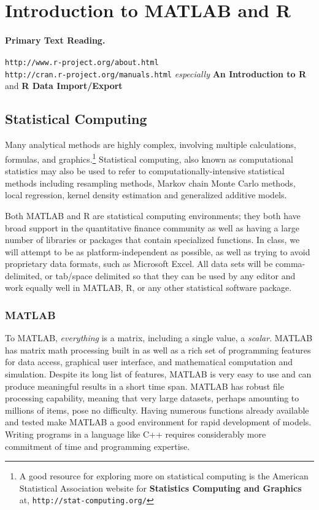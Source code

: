 \section{Introduction to MATLAB and R}
\paragraph{Primary Text Reading.}
\texttt{http://www.r-project.org/about.html} \\
\texttt{http://cran.r-project.org/manuals.html} \linebreak
\textit{especially} \textbf{An Introduction to R} and \textbf{R Data Import/Export}

\subsection{Statistical Computing}
Many analytical methods are highly complex, involving multiple calculations, formulas, and graphics.\footnote{A good resource for exploring more on statistical computing is the American Statistical Association website for \textbf{Statistics Computing and Graphics} at, \texttt{http://stat-computing.org/}}
Statistical computing, also known as computational statistics may also be used to refer to computationally-intensive statistical methods including resampling methods, Markov chain Monte Carlo methods, local regression, kernel density estimation and generalized additive models.

Both MATLAB and R are statistical computing environments; they both have broad support in the quantitative finance community as well as having a large number of libraries or packages that contain specialized functions. In class, we will attempt to be as platform-independent as possible, as well as trying to avoid proprietary data formats, such as Microsoft Excel. All data sets will be comma-delimited, or tab/space delimited so that they can be used by any editor and work equally well in MATLAB, R, or any other statistical software package.

\subsubsection{MATLAB}
To MATLAB, \emph{everything} is a matrix, including a single value, a \emph{scalar}. MATLAB has matrix math processing built in as well as a rich set of programming features for data access, graphical user interface, and mathematical computation and simulation. Despite its long list of features, MATLAB is very easy to use and can produce meaningful results in a short time span. MATLAB has robust file processing capability, meaning that very large datasets, perhaps amounting to millions of items, pose no difficulty. Having numerous functions already available and tested make MATLAB a good environment for rapid development of models. Writing programs in a language like C++ requires considerably more commitment of time and programming expertise.

